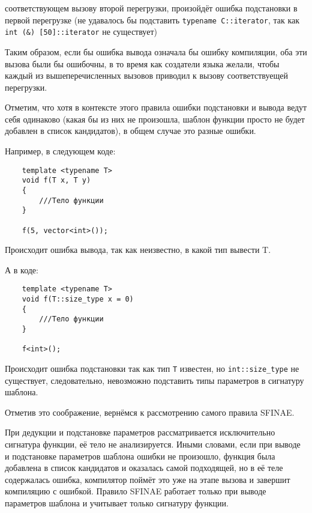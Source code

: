 	соответствующем вызову второй перегрузки, произойдёт ошибка подстановки в первой перегрузке (не удавалось бы подставить \texttt{typename C::iterator}, так как \texttt{int (&) [50]::iterator} не существует)
	
	Таким образом, если бы ошибка вывода означала бы ошибку компиляции, оба эти вызова были бы ошибочны, в то время как создатели языка желали, чтобы каждый из вышеперечисленных вызовов приводил к вызову соответствуещей перегрузки. 
	
	\vspace{\baselineskip}	
	
	Отметим, что хотя в контексте этого правила ошибки подстановки и вывода ведут себя одинаково (какая бы из них не произошла, шаблон функции просто не будет добавлен в список кандидатов), в общем случае это разные ошибки.
	
	Например, в следующем коде:
	
	\begin{verbatim}
	template <typename T>
	void f(T x, T y)
	{
	    ///Тело функции
	}
	
	f(5, vector<int>());
	\end{verbatim}
	
	Происходит ошибка вывода, так как неизвестно, в какой тип вывести T.
	
	А в коде:
	
	\begin{verbatim}
	template <typename T>
	void f(T::size_type x = 0)
	{
	    ///Тело функции
	}
	
	f<int>();
	\end{verbatim}
	
	Происходит ошибка подстановки так как тип \texttt{T} известен, но \texttt{int::size_type} не существует, следовательно, невозможно подставить типы параметров в сигнатуру шаблона.
	
	Отметив это соображение, вернёмся к рассмотрению самого правила SFINAE.
	
	\vspace{\baselineskip}	
	
	При дедукции и подстановке параметров рассматривается исключительно сигнатура функции, её тело не анализируется. Иными словами, если при выводе и подстановке параметров шаблона ошибки не произошло, функция была добавлена в список кандидатов и оказалась самой подходящей, но в её теле содержалась ошибка, компилятор поймёт это уже на этапе вызова и завершит компиляцию с ошибкой. Правило SFINAE работает только при выводе параметров шаблона и учитывает только сигнатуру функции.

